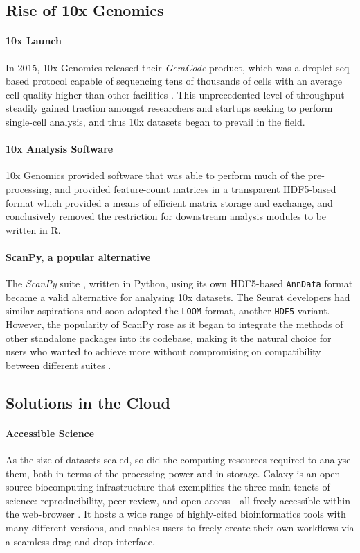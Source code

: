\documentclass[a4paper,num-refs]{oup-contemporary}
\newcommand{\prog}[1]{\textit{#1}} %
\newcommand{\fileformat}[1]{\texttt{#1}} %
\begin{document}
\subsection{Rise of 10x Genomics}

\paragraph{10x Launch}
In 2015, 10x Genomics released their \prog{GemCode} product, which was a droplet-seq based protocol capable of sequencing tens of thousands of cells with an average cell quality higher than other facilities \citep{vickovic2016massive}. This unprecedented level of throughput steadily gained traction amongst researchers and startups seeking to perform single-cell analysis, and thus 10x datasets began to prevail in the field. 


\paragraph{10x Analysis Software}
10x Genomics provided software that was able to perform much of the pre-processing, and provided feature-count matrices in a transparent HDF5-based format which provided a means of efficient matrix storage and exchange, and conclusively removed the restriction for downstream analysis modules to be written in R.

\paragraph{ScanPy, a popular alternative}
The \prog{ScanPy} suite \citep{wolf2018scanpy}, written in Python, using its own HDF5-based \fileformat{AnnData} format became a valid alternative for analysing 10x datasets. The Seurat developers had similar aspirations and soon adopted the \fileformat{LOOM} format, another \fileformat{HDF5} variant. However, the popularity of ScanPy rose as it began to integrate the methods of other standalone packages into its codebase, making it the natural choice for users who wanted to achieve more without compromising on compatibility between different suites \citep{scanpyreleases}.

\subsection{Solutions in the Cloud}
\paragraph{Accessible Science}
As the size of datasets scaled, so did the computing resources required to analyse them, both in terms of the processing power and in storage. Galaxy is an open-source biocomputing infrastructure that exemplifies the three main tenets of science: reproducibility, peer review, and open-access - all freely accessible within the web-browser \citep{afgan2018galaxy}. It hosts a wide range of highly-cited bioinformatics tools with many different versions, and enables users to freely create their own workflows via a seamless drag-and-drop interface. 
\end{document}
